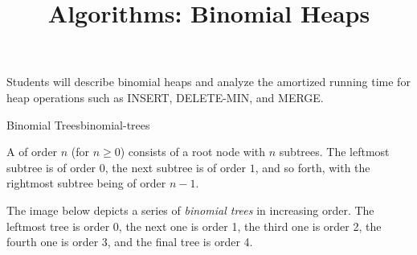 \documentclass{tufte-handout}
\title{Algorithms: Binomial Heaps}
\date{}
\begin{document}
\maketitle

\begin{objective}
  Students will describe binomial heaps and analyze the amortized
  running time for heap operations such as INSERT, DELETE-MIN, and MERGE.
\end{objective}

\begin{model*}{Binomial Trees}{binomial-trees}
  \begin{defn}
    A  of order $n$ (for $n \geq 0$) consists of a root
    node with $n$ subtrees. The leftmost subtree is of order $0$,
    the next subtree is of order $1$, and so forth, with the
    rightmost subtree being of order $n-1$.
  \end{defn}

  The image below depicts a series of \emph{binomial trees} in
  increasing order. The leftmost tree is order 0, the next one is
  order 1, the third one is order 2, the fourth one is order 3, and
  the final tree is order 4.

  \begin{center}
  
  \end{center}
  \label{binomial-trees}
\end{model*}
\end{document}
